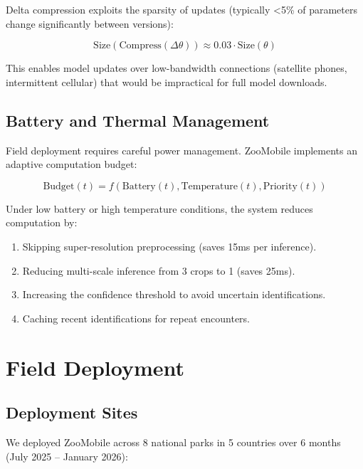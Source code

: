 \documentclass[11pt,a4paper]{article}
\begin{document}
Delta compression exploits the sparsity of updates (typically <5\% of parameters change significantly between versions):

\begin{equation}
    \text{Size}(\text{Compress}(\Delta\theta)) \approx 0.03 \cdot \text{Size}(\theta)
\end{equation}

This enables model updates over low-bandwidth connections (satellite phones, intermittent cellular) that would be impractical for full model downloads.

\subsection{Battery and Thermal Management}

Field deployment requires careful power management.
ZooMobile implements an adaptive computation budget:

\begin{equation}
    \text{Budget}(t) = f(\text{Battery}(t), \text{Temperature}(t), \text{Priority}(t))
\end{equation}

Under low battery or high temperature conditions, the system reduces computation by:
\begin{enumerate}[leftmargin=*]
    \item Skipping super-resolution preprocessing (saves 15ms per inference).
    \item Reducing multi-scale inference from 3 crops to 1 (saves 25ms).
    \item Increasing the confidence threshold to avoid uncertain identifications.
    \item Caching recent identifications for repeat encounters.
\end{enumerate}

\section{Field Deployment}
\label{sec:deployment}

\subsection{Deployment Sites}

We deployed ZooMobile across 8 national parks in 5 countries over 6 months (July 2025 -- January 2026):
\end{document}

